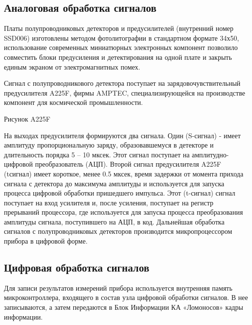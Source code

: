 \documentclass[a4paper,portrait,12pt]{article}
\begin{document}
{{{{\subsection*{	\textbf{Аналоговая обработка сигналов}}

Платы полупроводниковых детекторов и предусилителей (внутренний номер SSD006) изготовлены методом фотолитографии в стандартном формате 34х50, использование современных миниатюрных электронных компонент позволило совместить блоки предусиления и детектирования на одной плате и закрыть единым экраном от электромагнитных помех.


Сигнал с полупроводникового детектора поступает на зарядовочувствительный предусилителя A225F, фирмы AMPTEC, специализирующейся на производстве компонент для космической промышленности. 





\colorbox[rgb]{1.000,1.000,0.000}{Рисунок A225F}


На выходах предусилителя формируются два сигнала. Один (S-сигнал) - имеет амплитуду пропорциональную заряду, образовавшемуся в детекторе и длительность порядка 5 -- 10 мксек. Этот сигнал поступает на амплитудно-цифровой преобразователь (АЦП). Второй сигнал предусилителя A225F (tсигнал) имеет короткое, менее 0.5 мксек, время задержки от момента прихода сигнала с детектора до максимума амплитуды и используется для запуска процесса цифровой обработки пришедшего импульса. Этот (t-сигнал) сигнал поступает на вход усилителя и, после усиления, поступает на регистр прерываний процессора, где используется для запуска процесса преобразования амплитуды сигнала, поступившего на АЦП, в код. Дальнейшая обработка сигналов с полупроводниковых детекторов производится микропроцессором прибора в цифровой форме.





\subsection*{	\textbf{Цифровая обработка сигналов}}

Для записи результатов измерений прибора используется внутренняя память микроконтроллера, входящего в состав узла цифровой обработки сигналов. В нее записываются, а затем передаются в Блок Информации КА «Ломоносов» кадры информации.


}}}}
\end{document}
